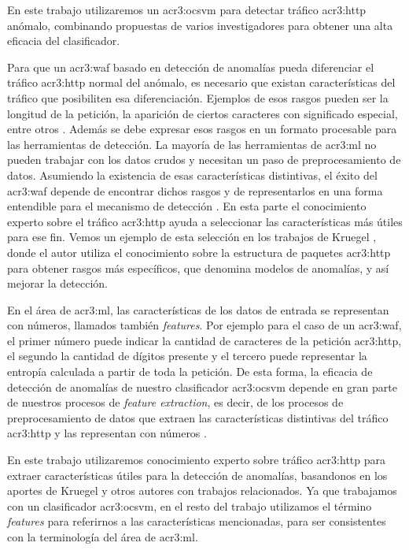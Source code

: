 En este trabajo utilizaremos un \gls{acr3:ocsvm} para detectar tráfico
\gls{acr3:http} anómalo, combinando propuestas de varios investigadores
para obtener una alta eficacia del clasificador.
\bigskip

Para que un \gls{acr3:waf} basado en detección de anomalías pueda diferenciar
el tráfico \gls{acr3:http} normal del anómalo, es necesario que existan
características del tráfico que posibiliten esa diferenciación.
Ejemplos de esos rasgos pueden ser la longitud de la petición, la aparición
de ciertos caracteres con significado especial, entre otros
\cite{kruegel2003anomaly} \cite{nguyen2011application}.
Además se debe expresar esos rasgos en un formato procesable para las
herramientas de detección. La mayoría de las herramientas de \gls{acr3:ml}
no pueden trabajar con los datos crudos y necesitan un paso de
preprocesamiento de datos.
Asumiendo la existencia de esas características distintivas, el éxito
del \gls{acr3:waf} depende de encontrar dichos rasgos y de representarlos
en una forma entendible para el mecanismo de detección
\cite{torranoGimenez2015study}.
En esta parte el conocimiento experto sobre el tráfico \gls{acr3:http}
ayuda a seleccionar las características más útiles para ese fin.
Vemos un ejemplo de esta selección en los trabajos de Kruegel
\cite{kruegel2003anomaly} \cite{kruegel2005multi}, donde el autor utiliza
el conocimiento sobre la estructura de paquetes \gls{acr3:http} para obtener
rasgos más específicos, que denomina modelos de anomalías, y así mejorar la
detección.

En el área de \gls{acr3:ml}, las características de los datos de entrada se
representan con números, llamados también \textit{features}.
Por ejemplo para el caso de un \gls{acr3:waf}, el primer número puede
indicar la cantidad de caracteres de la petición \gls{acr3:http}, el
segundo la cantidad de dígitos presente y el tercero puede representar
la entropía calculada a partir de toda la petición.
De esta forma, la eficacia de detección de anomalías de nuestro clasificador
\gls{acr3:ocsvm} depende en gran parte de nuestros procesos de
\textit{feature extraction}, es decir, de los procesos de preprocesamiento
de datos que extraen las características distintivas del tráfico
\gls{acr3:http} y las representan con números \cite{torranoGimenez2015study}.

En este trabajo utilizaremos conocimiento experto sobre tráfico \gls{acr3:http}
para extraer características útiles para la detección de anomalías,
basandonos en los aportes de Kruegel y otros autores con trabajos relacionados.
Ya que trabajamos con un clasificador \gls{acr3:ocsvm}, en el resto del
trabajo utilizamos el término \textit{features} para referirnos a las
características mencionadas, para ser consistentes con la terminología
del área de \gls{acr3:ml}.


